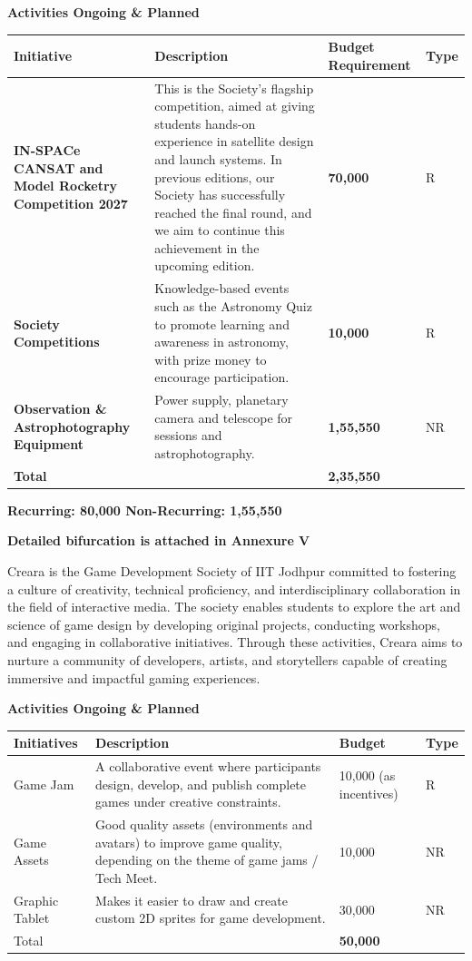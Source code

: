 \documentclass[11pt,letterpaper]{article}
\newcommand{\rs}{{\rupee}}
\newcommand{\society}[1]{\par\bigskip{\sffamily\bfseries\large #1}\par}
\newcommand{\subhead}[1]{\par{\bfseries #1}\par}
\begin{document}
\subhead{Activities Ongoing \& Planned}
\begin{longtable}{|L{0.25\textwidth}|L{0.40\textwidth}|L{0.17\textwidth}|C{0.06\textwidth}|}
\hline
\textbf{Initiative} & \textbf{Description} & \textbf{Budget Requirement} & \textbf{Type}\\ \hline
\textbf{IN-SPACe CANSAT and Model Rocketry Competition 2027} & This is the Society's flagship competition, aimed at giving students hands-on experience in satellite design and launch systems. In previous editions, our Society has successfully reached the final round, and we aim to continue this achievement in the upcoming edition. & \textbf{\rs70,000} & R\\ \hline
\textbf{Society Competitions} & Knowledge-based events such as the Astronomy Quiz to promote learning and awareness in astronomy, with prize money to encourage participation. & \textbf{\rs10,000} & R\\ \hline
\textbf{Observation \& Astrophotography Equipment} & Power supply, planetary camera and telescope for sessions and astrophotography. & \textbf{\rs1,55,550} & NR\\ \hline
\textbf{Total} & & \textbf{\rs2,35,550} & \\ \hline
\end{longtable}

\textbf{Recurring: \rs80,000 \quad Non-Recurring: \rs1,55,550}

\textbf{Detailed bifurcation is attached in Annexure V}

\clearpage
\society{9.\ \ Creara}

Creara is the Game Development Society of IIT Jodhpur committed to fostering a culture of creativity, technical proficiency, and interdisciplinary collaboration in the field of interactive media. The society enables students to explore the art and science of game design by developing original projects, conducting workshops, and engaging in collaborative initiatives. Through these activities, Creara aims to nurture a community of developers, artists, and storytellers capable of creating immersive and impactful gaming experiences.

\subhead{Activities Ongoing \& Planned}
\begin{longtable}{|L{0.25\textwidth}|L{0.40\textwidth}|C{0.17\textwidth}|C{0.06\textwidth}|}
\hline
\textbf{Initiatives} & \textbf{Description} & \textbf{Budget} & \textbf{Type}\\ \hline
Game Jam & A collaborative event where participants design, develop, and publish complete games under creative constraints. & \rs10,000 (as incentives) & R\\ \hline
Game Assets & Good quality assets (environments and avatars) to improve game quality, depending on the theme of game jams / Tech Meet. & \rs10,000 & NR\\ \hline
Graphic Tablet & Makes it easier to draw and create custom 2D sprites for game development. & \rs30,000 & NR\\ \hline
Total & & \textbf{\rs50,000} & \\ \hline
\end{longtable}
\end{document}
